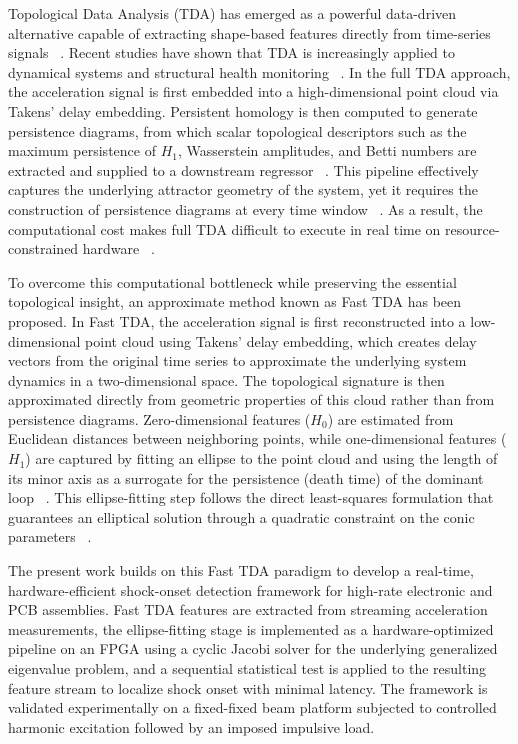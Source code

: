 \documentclass[colorlinks,upint,subscriptcorrection,varvw,hyphenate,balance,greek,russian,vietnamese,german]{asmeconf} %
\begin{document}
Topological Data Analysis (TDA) has emerged as a powerful data-driven alternative capable of extracting shape-based features directly from time-series signals ~\cite{Razmarashooli2023TDA}. Recent studies have shown that TDA is increasingly applied to dynamical systems and structural health monitoring ~\cite{Tempelman2020lookchaosdetection,Gowdridge2022TopologicalDataAnalysis}. In the full TDA approach, the acceleration signal is first embedded into a high-dimensional point cloud via Takens' delay embedding. Persistent homology is then computed to generate persistence diagrams, from which scalar topological descriptors such as the maximum persistence of \(H_1\), Wasserstein amplitudes, and Betti numbers are extracted and supplied to a downstream regressor ~\cite{Chua2025Probabilisticmachinelearning}. This pipeline effectively captures the underlying attractor geometry of the system, yet it requires the construction of persistence diagrams at every time window ~\cite{Razmarashooli2025Realtimestate}. As a result, the computational cost makes full TDA difficult to execute in real time on resource-constrained hardware ~\cite{SalazarMartinez2025FastTopologicalData}.

\pagebreak
To overcome this computational bottleneck while preserving the essential topological insight, an approximate method known as Fast TDA has been proposed. In Fast TDA, the acceleration signal is first reconstructed into a low-dimensional point cloud using Takens' delay embedding, which creates delay vectors from the original time series to approximate the underlying system dynamics in a two-dimensional space. The topological signature is then approximated directly from geometric properties of this cloud rather than from persistence diagrams. Zero-dimensional features (\(H_0\)) are estimated from Euclidean distances between neighboring points, while one-dimensional features (\(H_1\)) are captured by fitting an ellipse to the point cloud and using the length of its minor axis as a surrogate for the persistence (death time) of the dominant loop ~\cite{SalazarMartinez2025FastTopologicalData}. This ellipse-fitting step follows the direct least-squares formulation that guarantees an elliptical solution through a quadratic constraint on the conic parameters ~\cite{Fitzgibbon1999Directleastsquare}.

The present work builds on this Fast TDA paradigm to develop a real-time, hardware-efficient shock-onset detection framework for high-rate electronic and PCB assemblies. Fast TDA features are extracted from streaming acceleration measurements, the ellipse-fitting stage is implemented as a hardware-optimized pipeline on an FPGA using a cyclic Jacobi solver for the underlying generalized eigenvalue problem, and a sequential statistical test is applied to the resulting feature stream to localize shock onset with minimal latency. The framework is validated experimentally on a fixed-fixed beam platform subjected to controlled harmonic excitation followed by an imposed impulsive load.
\end{document}
